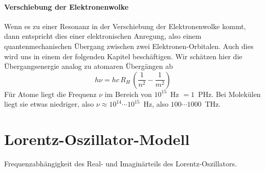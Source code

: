 \paragraph{Verschiebung der Elektronenwolke} Wenn es zu einer Resonanz in der Verschiebung der Elektronenwolke kommt, dann entspricht dies einer elektronischen Anregung, also einem quantenmechanischen Übergang zwischen zwei Elektronen-Orbitalen. Auch dies wird uns in einem der folgenden Kapitel beschäftigen. Wir schätzen hier die Übergangsenergie analog zu atomaren Übergängen ab
\begin{equation}
  h \nu = hc \, R_H \, \left( \frac{1}{n^2} - \frac{1}{m^2} \right)
\end{equation}
Für Atome liegt die Frequenz $\nu$ im Bereich von $10^{15}$~Hz $= 1$~PHz. Bei Molekülen liegt sie etwas niedriger, also $\nu \approx 10^{14} \cdots 10^{15}$~Hz, also $100 \cdots 1000$~THz.


\section{Lorentz-Oszillator-Modell}


\begin{marginfigure}

\caption{Frequenzabhängigkeit des Real- und Imaginärteils des Lorentz-Oszillators.}
\end{marginfigure}

